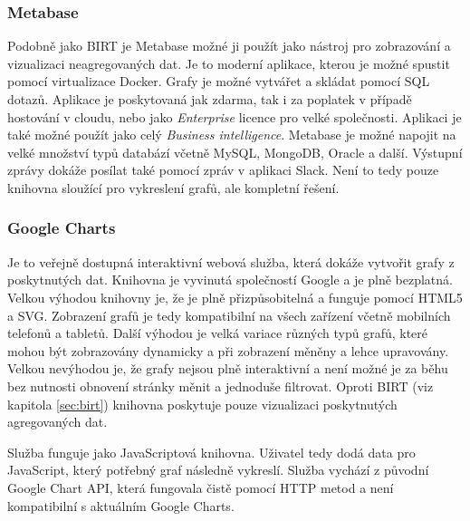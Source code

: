 \documentclass[czech,master,public,dept460,male,cpdeclaration,oneside]{diploma}
\begin{document}
\subsubsection{Metabase}
Podobně jako BIRT je Metabase možné ji použít jako nástroj pro zobrazování a vizualizaci neagregovaných dat. Je to moderní aplikace, kterou je možné spustit pomocí virtualizace Docker. Grafy je možné vytvářet a skládat pomocí SQL dotazů. Aplikace je poskytovaná jak zdarma, tak i za poplatek v případě hostování v cloudu, nebo jako \textit{Enterprise} licence pro velké společnosti. Aplikaci je také možné použít jako celý \textit{Business intelligence}. Metabase je možné napojit na velké množství typů databází včetně MySQL, MongoDB, Oracle a další. Výstupní zprávy dokáže posílat také pomocí zpráv v aplikaci Slack. Není to tedy pouze knihovna sloužící pro vykreslení grafů, ale kompletní řešení. \cite{ref:metabase}


\subsubsection{Google Charts}
\label{sec:google_charts}
Je to veřejně dostupná interaktivní webová služba, která dokáže vytvořit grafy z poskytnutých dat. Knihovna je vyvinutá společností Google a je plně bezplatná. Velkou výhodou knihovny je, že je plně přizpůsobitelná a funguje pomocí HTML5 a SVG. Zobrazení grafů je tedy kompatibilní na všech zařízení včetně mobilních telefonů a tabletů. Další výhodou je velká variace různých typů grafů, které mohou být zobrazovány dynamicky a při zobrazení měněny a lehce upravovány. Velkou nevýhodou je, že grafy nejsou plně interaktivní a není možné je za běhu bez nutnosti obnovení stránky měnit a jednoduše filtrovat. Oproti BIRT (viz kapitola \ref{sec:birt}) knihovna poskytuje pouze vizualizaci poskytnutých agregovaných dat.

Služba funguje jako JavaScriptová knihovna. Uživatel tedy dodá data pro JavaScript, který potřebný graf následně vykreslí. Služba vychází z původní Google Chart API, která fungovala čistě pomocí HTTP metod a není kompatibilní s aktuálním Google Charts. \cite{ref:google_charts}
\end{document}
